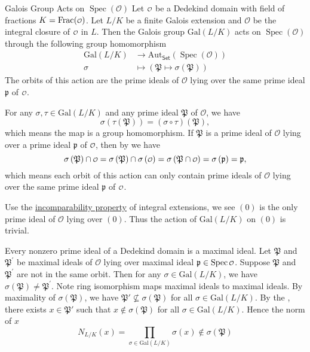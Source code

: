 \begin{proposition}{Galois Group Acts on $\operatorname{Spec}\left(\mathcal{O}\right)$}{}
    Let $\mathcalo$ be a Dedekind domain with field of fractions $K=\mathrm{Frac}(\mathcalo)$. Let $L/K$ be a finite Galois extension and $\mathcal{O}$ be the integral closure of $\mathcalo$ in $L$. Then the Galois group $\mathrm{Gal}(L/K)$ acts on $\operatorname{Spec}\left(\mathcal{O}\right)$ through the following group homomorphism
    \begin{align*}
        \mathrm{Gal}(L/K)&\longrightarrow \mathrm{Aut}_{\mathsf{Set}}\left(\operatorname{Spec}\left(\mathcal{O}\right)\right)\\
        \sigma&\longmapsto \left(\mathfrak{P}\longmapsto\sigma\left(\mathfrak{P}\right)\right)
    \end{align*}
    The orbits of this action are the prime ideals of $\mathcal{O}$ lying over the same prime ideal $\mathfrak{p}$ of $\mathcalo$.
\end{proposition}
\begin{prf}
For any $\sigma,\tau\in \mathrm{Gal}(L/K)$ and any prime ideal $\mathfrak{P}$ of $\mathcal{O}$, we have
\[
    \sigma\left(\tau\left(\mathfrak{P}\right)\right)=\left(\sigma\circ \tau\right)\left(\mathfrak{P}\right),
\]
which means the map is a group homomorphism. If $\mathfrak{P}$ is a prime ideal of $\mathcal{O}$ lying over a prime ideal $\mathfrak{p}$ of $\mathcalo$, then by  we have
\[
\sigma\left(\mathfrak{P}\right)\cap \mathcalo=\sigma\left(\mathfrak{P}\right)\cap \sigma\left(\mathcalo\right)=\sigma\left(\mathfrak{P}\cap \mathcalo\right)=\sigma\left(\mathfrak{p}\right)=\mathfrak{p},
\]
which means each orbit of this action can only contain prime ideals of $\mathcal{O}$ lying over the same prime ideal $\mathfrak{p}$ of $\mathcalo$.

Use the \hyperref[th:going_up_and_going_down_theorems]{incomparability property} of integral extensions, we see $(0)$ is the only prime ideal of $\mathcal{O}$ lying over $(0)$. Thus the action of $\mathrm{Gal}(L/K)$ on $(0)$ is trivial.

Every nonzero prime ideal of a Dedekind domain is a maximal ideal. Let $\mathfrak{P}$ and $\mathfrak{P}^\prime$ be maximal ideals of $\mathcal{O}$ lying over maximal ideal $\mathfrak{p}\in\spec \mathcalo$. Suppose $\mathfrak{P}$ and $\mathfrak{P}^\prime$ are not in the same orbit. Then for any $\sigma\in \mathrm{Gal}(L/K)$, we have $\sigma(\mathfrak{P})\ne \mathfrak{P}^\prime$. Note ring isomorphism maps maximal ideals to maximal ideals. By maximality of $\sigma(\mathfrak{P})$, we have $\mathfrak{P}'\not\subseteq \sigma(\mathfrak{P})$ for all $\sigma\in\mathrm{Gal}(L/K)$. By the , there exists $x\in \mathfrak{P}'$ such that $x\notin \sigma(\mathfrak{P})$ for all $\sigma\in\mathrm{Gal}(L/K)$. Hence the norm of $x$
\[
N_{L/K}(x)=\prod_{\sigma\in \mathrm{Gal}(L/K)}\sigma(x)\notin \sigma(\mathfrak{P})
\]
\end{prf}

